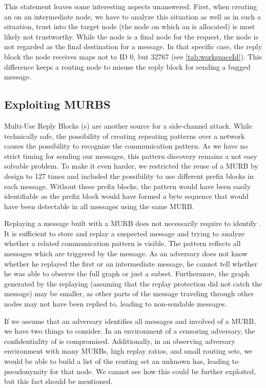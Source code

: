 This statement leaves some interesting aspects unanswered. First, when creating an  on an intermediate node, we have to analyze this situation as well as in such a situation, trust into the target node (the node on which an  is allocated) is most likely not trustworthy. While the node is a final node for the request, the node is not regarded as the final destination for a message. In that specific case, the reply block the node receives maps not to ID 0, but 32767 (see \cref{tab:workspaceId}). This difference keeps a routing node to misuse the reply block for sending a bugged message.

\subsection{Exploiting MURBS}
Multi-Use Reply Blocks (s) are another source for a side-channel attack. While technically safe, the possibility of creating repeating patterns over a network causes the possibility to recognize the communication pattern. As we have no strict timing for sending our messages, this pattern discovery remains a not easy solvable problem. To make it even harder, we restricted the reuse of a MURB by design to 127 times and included the possibility to use different prefix blocks in each message. Without these prefix blocks, the pattern would have been easily identifiable as the prefix block would have formed a byte sequence that would have been detectable in all messages using the same MURB.

Replaying a message built with a MURB does not necessarily require to identify \VortexMessages{}. It is sufficient to store and replay a suspected message and trying to analyze whether a related communication pattern is visible. The pattern reflects all messages which are triggered by the message. As an adversary does not know whether he replayed the first or an intermediate message, he cannot tell whether he was able to observe the full graph or just a subset. Furthermore, the graph generated by the replaying (assuming that the replay protection did not catch the message) may be smaller, as other parts of the message traveling through other nodes may not have been replied to, leading to non-sendable messages.

If we assume that an adversary identifies all messages and involved \VortexNodes{} of a MURB, we have two things to consider. In an environment of a censoring adversary, the confidentiality of \VortexNodes{} is compromised. Additionally, in an observing adversary environment with many MURBs, high replay ratios, and small routing sets, we would be able to build a list of the routing set an unknown \VortexNode{} has, leading to pseudonymity for that node. We cannot see how this could be further exploited, but this fact should be mentioned. 

